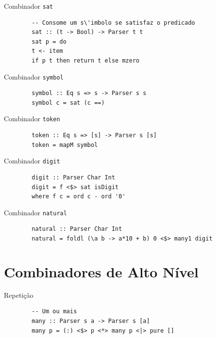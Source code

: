 \begin{frame}[fragile]{Combinador \texttt{sat}}

    \begin{lstlisting}
        -- Consome um s\'imbolo se satisfaz o predicado
        sat :: (t -> Bool) -> Parser t t
        sat p = do
        t <- item
        if p t then return t else mzero
    \end{lstlisting}
\end{frame}

\begin{frame}[fragile]{Combinador \texttt{symbol}}

    \begin{lstlisting}
        symbol :: Eq s => s -> Parser s s
        symbol c = sat (c ==)
    \end{lstlisting}
\end{frame}

\begin{frame}[fragile]{Combinador \texttt{token}}

    \begin{lstlisting}
        token :: Eq s => [s] -> Parser s [s]
        token = mapM symbol
    \end{lstlisting}
\end{frame}

\begin{frame}[fragile]{Combinador \texttt{digit}}

    \begin{lstlisting}
        digit :: Parser Char Int
        digit = f <$> sat isDigit
        where f c = ord c - ord '0'
    \end{lstlisting}
\end{frame}

\begin{frame}[fragile]{Combinador \texttt{natural}}

    \begin{lstlisting}
        natural :: Parser Char Int
        natural = foldl (\a b -> a*10 + b) 0 <$> many1 digit
    \end{lstlisting}
\end{frame}


\section{Combinadores de Alto
Nível}\label{combinadores-de-alto-nuxedvel}

\begin{frame}[fragile]{Repetição}

    \begin{lstlisting}
        -- Um ou mais
        many :: Parser s a -> Parser s [a]
        many p = (:) <$> p <*> many p <|> pure []
    \end{lstlisting}
\end{frame}

